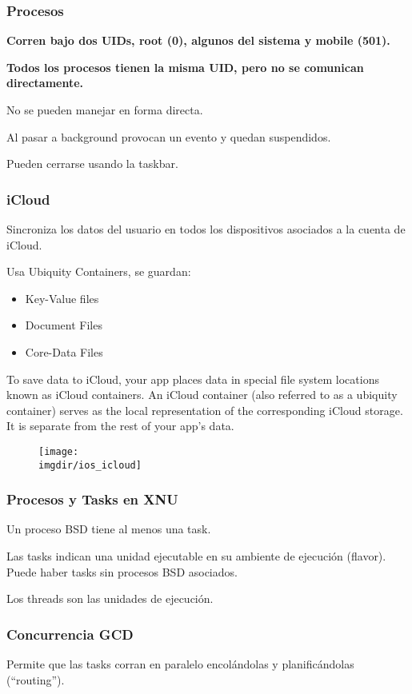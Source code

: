 \documentclass[a4paper, twoside]{article}
\newcommand{\imgdir}{../resources/images} %
\begin{document}
\subsubsection{Procesos}
\textbf{Corren bajo dos UIDs, root (0), algunos del sistema y mobile (501).}

\textbf{Todos los procesos tienen la misma UID, pero no se comunican directamente.}

No se pueden manejar en forma directa.

Al pasar a background provocan un evento y quedan suspendidos.

Pueden cerrarse usando la taskbar.

\subsubsection{iCloud}
Sincroniza los datos del usuario en todos los dispositivos asociados a la cuenta de iCloud.

Usa Ubiquity Containers, se guardan:
\begin{itemize}
	\item Key-Value files 
	\item Document Files
	\item Core-Data Files
\end{itemize}

To save data to iCloud, your app places data in special file system locations known as iCloud containers. An iCloud container (also referred to as a ubiquity container) serves as the local representation of the corresponding iCloud storage. It is separate from the rest of your app's data. 

\begin{figure}[h]
	\centering
	\texttt{[image: \\imgdir/ios\_icloud]}
	\label{fig:ios_icloud}
\end{figure}

\subsubsection{Procesos y Tasks en XNU}
Un proceso BSD tiene al menos una task.

Las tasks indican una unidad ejecutable en su ambiente de ejecución (flavor). Puede haber tasks sin procesos BSD asociados.

Los threads son las unidades de ejecución.

\subsubsection{Concurrencia GCD}
Permite que las tasks corran en paralelo encolándolas y planificándolas (``routing'').
\end{document}

